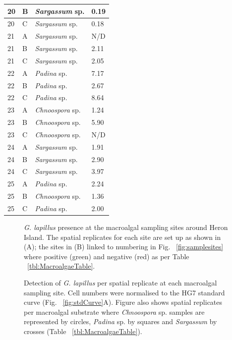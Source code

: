 \documentclass[10pt,letterpaper]{article}
\begin{document}
\begin{longtable}{ | p{2cm} | p{2cm} | p{3cm} | p{3.5cm} |}
20
&B&\emph{Sargassum} sp.&0.19\\
\hline
20
&C&\emph{Sargassum} sp.&0.18\\
\hline
21
&A&\emph{Sargassum} sp.&N/D\\
\hline
21
&B&\emph{Sargassum} sp.&2.11\\
\hline
21
&C&\emph{Sargassum} sp.&2.05\\
\hline
22
&A&\emph{Padina} sp.&7.17\\
\hline
22
&B&\emph{Padina} sp.&2.67\\
\hline
22
&C&\emph{Padina} sp.&8.64\\
\hline
23&A&\emph{Chnoospora }sp.&1.24
\\
\hline
23&B&\emph{Chnoospora }sp.&5.90
\\
\hline
23&C&\emph{Chnoospora} sp.&N/D\\
\hline
24&A&\emph{Sargassum} sp.&1.91
\\
\hline
24&B&\emph{Sargassum} sp.&2.90
\\
\hline
24&C&\emph{Sargassum} sp.&3.97
\\
\hline
25&A&\emph{Padina} sp.
&2.24
\\
\hline
25&B&\emph{Chnoospora }sp.
&1.36
\\
\hline
25&C&\emph{Padina} sp.
&2.00
\\
\hline
\end{longtable}
\FloatBarrier
\begin{figure} 
\caption{\emph{G. lapillus} presence at the macroalgal sampling sites around Heron Island. The spatial replicates for each site are set up as shown in (A); the sites in (B) linked to numbering in Fig. ~\ref{fig:samplesites} where positive (green) and negative (red) as per Table ~\ref{tbl:MacroalgaeTable}.} 
\label{fig:envposneg}
\end{figure} 
 
\begin{figure} 
\caption{Detection of \emph{G. lapillus} per spatial replicate at each macroalgal sampling site. Cell numbers were normalised to the HG7 standard curve (Fig. ~\ref{fig:stdCurve}A). Figure also shows spatial replicates per macroalgal substrate where \emph{Chnoospora} sp. samples are represented by circles, \emph{Padina} sp. by squares and \textit{Sargassum} by crosses (Table ~\ref{tbl:MacroalgaeTable}).} 
\label{fig:envHG7}
\end{figure} 
\FloatBarrier
\end{document}
